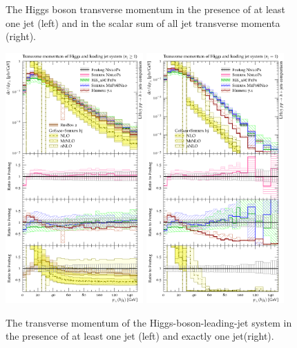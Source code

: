 \begin{figure}[t!]
  \caption{
    The Higgs boson transverse momentum in the presence of at least one 
    jet (left) and in the scalar sum of all jet transverse momenta (right).
    \label{fig:higgscomp:results:1obs:hpt_ht}
  }
\end{figure}

\begin{figure}[t!]
  \centering
  \includegraphics[width=0.47\textwidth]{figures/hjetscomp_Hj_pT_incl.pdf}
  \quad
  \includegraphics[width=0.47\textwidth]{figures/hjetscomp_Hj_pT_excl.pdf}
  \caption{
    The transverse momentum of the Higgs-boson-leading-jet system in the 
    presence of at least one jet (left) and exactly one jet(right).
    \label{fig:higgscomp:results:1obs:hjpt}
  }
\end{figure}


